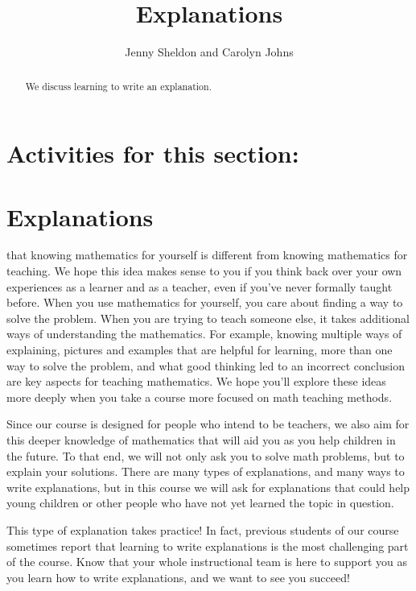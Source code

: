 \documentclass[noauthor,nooutcomes]{ximera}
\title{Explanations}
\author{Jenny Sheldon and Carolyn Johns}
\begin{document}
\begin{abstract}
We discuss learning to write an explanation.
\end{abstract}
\maketitle

\section{Activities for this section:} 


\section{Explanations}



  that knowing mathematics for yourself is different from knowing mathematics for teaching. We hope this idea makes sense to you if you think back over your own experiences as a learner and as a teacher, even if you've never formally taught before. When you use mathematics for yourself, you care about finding a way to solve the problem. When you are trying to teach someone else, it takes additional ways of understanding the mathematics. For example, knowing multiple ways of explaining, pictures and examples that are helpful for learning, more than one way to solve the problem, and what good thinking led to an incorrect conclusion are key aspects for teaching mathematics. We hope you'll explore these ideas more deeply when you take a course more focused on math teaching methods.

Since our course is designed for people who intend to be teachers, we also aim for this deeper knowledge of mathematics that will aid you as you help children in the future. To that end, we will not only ask you to solve math problems, but to explain your solutions. There are many types of explanations, and many ways to write explanations, but in this course we will ask for explanations that could help young children or other people who have not yet learned the topic in question.

This type of explanation takes practice! In fact, previous students of our course sometimes report that learning to write explanations is the most challenging part of the course. Know that your whole instructional team is here to support you as you learn how to write explanations, and we want to see you succeed!
\end{document}
